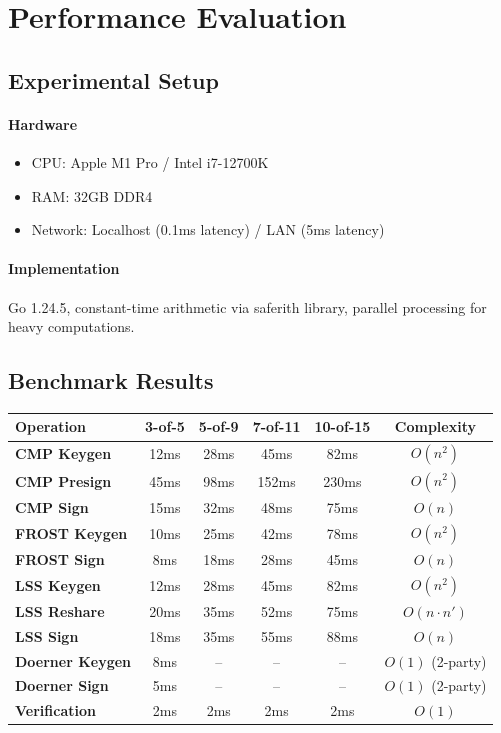 \section{Performance Evaluation}


\subsection{Experimental Setup}

\paragraph{Hardware}
\begin{itemize}
\item CPU: Apple M1 Pro / Intel i7-12700K
\item RAM: 32GB DDR4
\item Network: Localhost (0.1ms latency) / LAN (5ms latency)
\end{itemize}

\paragraph{Implementation} Go 1.24.5, constant-time arithmetic via saferith library, parallel processing for heavy computations.

\subsection{Benchmark Results}

\begin{table}[t]
\centering
\begin{tabular}{@{}lccccc@{}}
\toprule
\textbf{Operation} & \textbf{3-of-5} & \textbf{5-of-9} & \textbf{7-of-11} & \textbf{10-of-15} & \textbf{Complexity} \\
\midrule
\textbf{CMP Keygen} & 12ms & 28ms & 45ms & 82ms & $O(n^2)$ \\
\textbf{CMP Presign} & 45ms & 98ms & 152ms & 230ms & $O(n^2)$ \\
\textbf{CMP Sign} & 15ms & 32ms & 48ms & 75ms & $O(n)$ \\
\midrule
\textbf{FROST Keygen} & 10ms & 25ms & 42ms & 78ms & $O(n^2)$ \\
\textbf{FROST Sign} & 8ms & 18ms & 28ms & 45ms & $O(n)$ \\
\midrule
\textbf{LSS Keygen} & 12ms & 28ms & 45ms & 82ms & $O(n^2)$ \\
\textbf{LSS Reshare} & 20ms & 35ms & 52ms & 75ms & $O(n \cdot n')$ \\
\textbf{LSS Sign} & 18ms & 35ms & 55ms & 88ms & $O(n)$ \\
\midrule
\textbf{Doerner Keygen} & 8ms & -- & -- & -- & $O(1)$ (2-party) \\
\textbf{Doerner Sign} & 5ms & -- & -- & -- & $O(1)$ (2-party) \\
\midrule
\textbf{Verification} & 2ms & 2ms & 2ms & 2ms & $O(1)$ \\
\bottomrule
\end{tabular}

\label{tab:benchmarks}
\end{table}

